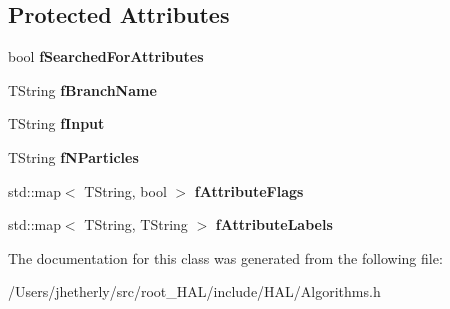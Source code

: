 \subsection*{Protected Attributes}
\begin{DoxyCompactItemize}
\item 
\hypertarget{class_h_a_l_1_1internal_1_1_particles_t_l_v_store_a25a2d01704c3b0a24cce93b1e088d480}{bool {\bfseries f\-Searched\-For\-Attributes}}\label{class_h_a_l_1_1internal_1_1_particles_t_l_v_store_a25a2d01704c3b0a24cce93b1e088d480}

\item 
\hypertarget{class_h_a_l_1_1internal_1_1_particles_t_l_v_store_ad9e5293405e566c6ef89e660d1829f86}{T\-String {\bfseries f\-Branch\-Name}}\label{class_h_a_l_1_1internal_1_1_particles_t_l_v_store_ad9e5293405e566c6ef89e660d1829f86}

\item 
\hypertarget{class_h_a_l_1_1internal_1_1_particles_t_l_v_store_a1015d1fe6989a7a745c0b3054b11ff85}{T\-String {\bfseries f\-Input}}\label{class_h_a_l_1_1internal_1_1_particles_t_l_v_store_a1015d1fe6989a7a745c0b3054b11ff85}

\item 
\hypertarget{class_h_a_l_1_1internal_1_1_particles_t_l_v_store_ab6d4e311126b2ce8cac85544a16bbaaf}{T\-String {\bfseries f\-N\-Particles}}\label{class_h_a_l_1_1internal_1_1_particles_t_l_v_store_ab6d4e311126b2ce8cac85544a16bbaaf}

\item 
\hypertarget{class_h_a_l_1_1internal_1_1_particles_t_l_v_store_a6d64a909935b377a66b89a7620dc5d6e}{std\-::map$<$ T\-String, bool $>$ {\bfseries f\-Attribute\-Flags}}\label{class_h_a_l_1_1internal_1_1_particles_t_l_v_store_a6d64a909935b377a66b89a7620dc5d6e}

\item 
\hypertarget{class_h_a_l_1_1internal_1_1_particles_t_l_v_store_af5e27520ce18a6a9e2651ba2fab39277}{std\-::map$<$ T\-String, T\-String $>$ {\bfseries f\-Attribute\-Labels}}\label{class_h_a_l_1_1internal_1_1_particles_t_l_v_store_af5e27520ce18a6a9e2651ba2fab39277}

\end{DoxyCompactItemize}


The documentation for this class was generated from the following file\-:\begin{DoxyCompactItemize}
\item 
/\-Users/jhetherly/src/root\-\_\-\-H\-A\-L/include/\-H\-A\-L/Algorithms.\-h\end{DoxyCompactItemize}
